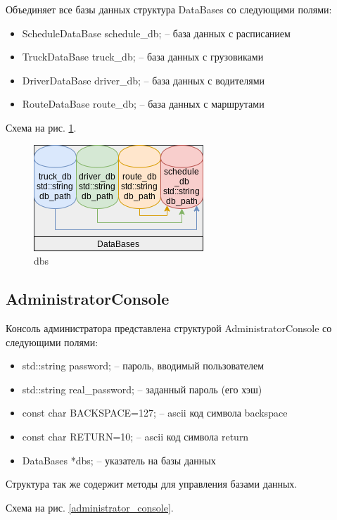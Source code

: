 Объединяет все базы данных структура DataBases со следующими полями: 

\begin{itemize}
    \item ScheduleDataBase schedule\_db; -- база данных с расписанием
    \item TruckDataBase truck\_db; -- база данных с грузовиками
    \item DriverDataBase driver\_db; -- база данных с водителями
    \item RouteDataBase route\_db; -- база данных с маршрутами
\end{itemize}

Схема на рис. \ref{dbs}.

\begin{figure}[hpt!]
    \centering
    \includegraphics[width=0.4\linewidth]{photo/data_structures/dbs}
    \caption{dbs}
    \label{dbs}
\end{figure}

\subsection{AdministratorConsole}

Консоль администратора представлена структурой AdministratorConsole со следующими полями: 

\begin{itemize}
    \item std::string password; -- пароль, вводимый пользователем
    \item std::string real\_password; -- заданный пароль (его хэш)
    \item const char BACKSPACE=127; -- ascii код символа backspace
    \item const char RETURN=10; -- ascii код символа return
    \item DataBases *dbs{}; -- указатель на базы данных
\end{itemize}

Структура так же содержит методы для управления базами данных.

Схема на рис. \ref{administrator_console}.

